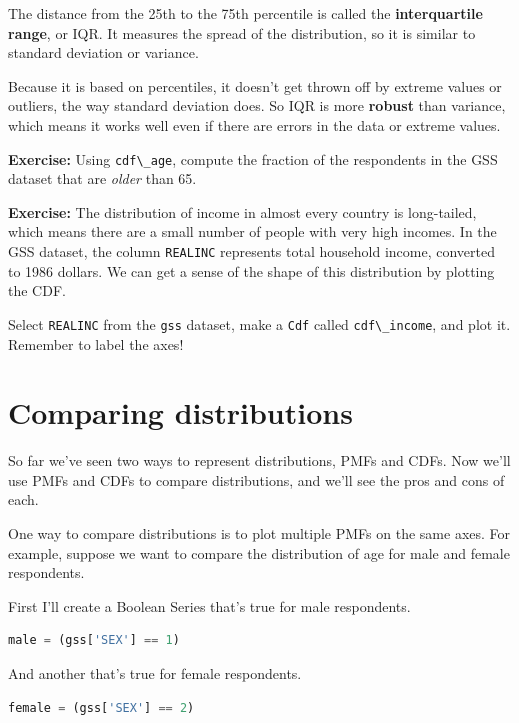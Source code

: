 The distance from the 25th to the 75th percentile is called the
\textbf{interquartile range}, or IQR. It measures the spread of the
distribution, so it is similar to standard deviation or variance.

Because it is based on percentiles, it doesn't get thrown off by extreme
values or outliers, the way standard deviation does. So IQR is more
\textbf{robust} than variance, which means it works well even if there
are errors in the data or extreme values.

\textbf{Exercise:} Using \passthrough{\lstinline!cdf\_age!}, compute the
fraction of the respondents in the GSS dataset that are \emph{older}
than 65.

\textbf{Exercise:} The distribution of income in almost every country is
long-tailed, which means there are a small number of people with very
high incomes. In the GSS dataset, the column
\passthrough{\lstinline!REALINC!} represents total household income,
converted to 1986 dollars. We can get a sense of the shape of this
distribution by plotting the CDF.

Select \passthrough{\lstinline!REALINC!} from the
\passthrough{\lstinline!gss!} dataset, make a
\passthrough{\lstinline!Cdf!} called
\passthrough{\lstinline!cdf\_income!}, and plot it. Remember to label
the axes!

\hypertarget{comparing-distributions}{%
\section{Comparing distributions}\label{comparing-distributions}}

So far we've seen two ways to represent distributions, PMFs and CDFs.
Now we'll use PMFs and CDFs to compare distributions, and we'll see the
pros and cons of each.

One way to compare distributions is to plot multiple PMFs on the same
axes. For example, suppose we want to compare the distribution of age
for male and female respondents.

First I'll create a Boolean Series that's true for male respondents.

\begin{lstlisting}[language=Python]
male = (gss['SEX'] == 1)
\end{lstlisting}

And another that's true for female respondents.

\begin{lstlisting}[language=Python]
female = (gss['SEX'] == 2)
\end{lstlisting}

